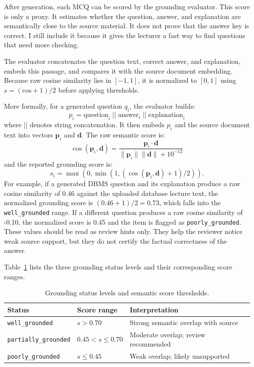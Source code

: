 \documentclass[12pt,a4paper]{article}
\begin{document}
After generation, each MCQ can be scored by the grounding evaluator. This
score is only a proxy. It estimates whether the question, answer, and
explanation are semantically close to the source material. It does not prove
that the answer key is correct. I still include it because it gives the
lecturer a fast way to find questions that need more checking.

The evaluator concatenates the question text, correct answer, and
explanation, embeds this passage, and compares it with the source document
embedding. Because raw cosine similarity lies in $[-1, 1]$, it is normalized
to $[0, 1]$ using $s = (\text{cos} + 1) / 2$ before applying thresholds.

More formally, for a generated question $q_i$, the evaluator builds:
\[
  p_i = \text{question}_i \; || \; \text{answer}_i \; || \; \text{explanation}_i
\]
where $||$ denotes string concatenation. It then embeds $p_i$ and the source
document text into vectors $\mathbf{p}_i$ and $\mathbf{d}$. The raw semantic
score is:
\[
  \cos(\mathbf{p}_i, \mathbf{d}) =
  \frac{\mathbf{p}_i \cdot \mathbf{d}}
       {\|\mathbf{p}_i\| \|\mathbf{d}\| + 10^{-12}}
\]
and the reported grounding score is:
\[
  s_i = \max(0, \min(1, (\cos(\mathbf{p}_i, \mathbf{d}) + 1) / 2)).
\]
For example, if a generated DBMS question and its explanation produce a raw
cosine similarity of 0.46 against the uploaded database lecture text, the
normalized grounding score is $(0.46 + 1) / 2 = 0.73$, which falls into the
\texttt{well\_grounded} range. If a different question produces a raw cosine
similarity of -0.10, the normalized score is 0.45 and the item is flagged as
\texttt{poorly\_grounded}. These values should be read as review hints only.
They help the reviewer notice weak source support, but they do not certify
the factual correctness of the answer.

Table~\ref{tab:grounding} lists the three grounding status levels and their
corresponding score ranges.

\begin{table}[H]
  \centering
  \singlespacing
  \caption{Grounding status levels and semantic score thresholds.}
  \label{tab:grounding}
  \small
  \begin{tabular}{@{}p{3.4cm}p{2.6cm}p{7.4cm}@{}}
    \toprule
    \textbf{Status} & \textbf{Score range} & \textbf{Interpretation} \\
    \midrule
    \texttt{well\_grounded}      & $s > 0.70$          & Strong semantic overlap with source \\
    \texttt{partially\_grounded} & $0.45 < s \leq 0.70$ & Moderate overlap; review recommended \\
    \texttt{poorly\_grounded}    & $s \leq 0.45$        & Weak overlap; likely unsupported \\
    \bottomrule
  \end{tabular}
\end{table}
\end{document}
